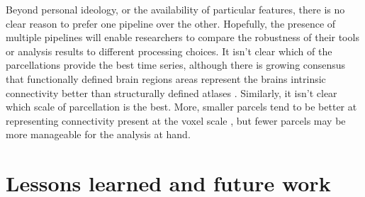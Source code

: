 \documentclass[preprint,12pt,3p]{elsarticle}
\begin{document}
Beyond personal ideology, or the availability of particular features, there is no clear reason to prefer one pipeline over the other. Hopefully, the presence of multiple pipelines will enable researchers to compare the robustness of their tools or analysis results to different processing choices. It isn't clear which of the parcellations provide the best time series, although there is growing consensus that functionally defined brain regions areas represent the brains intrinsic connectivity better than structurally defined atlases \cite{craddock2012whole, Blumensath2013, thirion2014}. Similarly, it isn't clear which scale of parcellation is the best. More, smaller parcels tend to be better at representing connectivity present at the voxel scale \cite{bellec2006identification, craddock2012whole, thirion2014}, but fewer parcels may be more manageable for the analysis at hand. 

\section{Lessons learned and future work}
\end{document}
